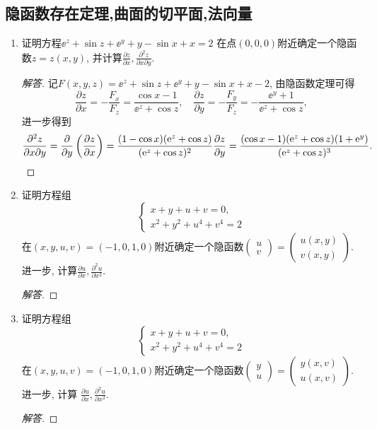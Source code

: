 \subsection{隐函数存在定理,曲面的切平面,法向量}
\begin{1a}
\begin{enumerate}
\item 证明方程\(\ee^z+\sin z+\ee^y+y-\sin x+x=2\)
在点\((0,0,0)\)附近确定一个隐函数\(z=z(x,y)\), 
并计算\(\frac{\partial z}{\partial x},\frac{\partial^2 z}{\partial x\partial y}\).
\begin{proof}[解答]
记\(F(x,y,z)=\ee^z+\sin z+\ee^y+y-\sin x+x-2\), 由隐函数定理可得
\[\frac{\partial z}{\partial x}=-\frac{F_x}{F_z}=\frac{\cos x-1}{\ee^z+\cos z},\quad
\frac{\partial z}{\partial y}=-\frac{F_y}{F_z}=-\frac{\ee^y+1}{\ee^z+\cos z},\]
进一步得到\[\frac{\partial^2z}{\partial x\partial y}
=\frac{\partial}{\partial y}\left(\frac{\partial z}{\partial x}\right)
=\frac{(1-\cos x)({\rm e}^z+\cos z)}{({\rm e}^z+\cos z)^2}\frac{\partial z}{\partial y}
=\frac{(\cos x-1)({\rm e}^z+\cos z)(1+{\rm e}^y)}{({\rm e}^z+\cos z)^3}.\qedhere\]
\end{proof}
\item 证明方程组\[\begin{cases}
    x+y+u+v=0,\\ x^2+y^2+u^4+v^4=2
\end{cases}\]在\((x,y,u,v)=(-1,0,1,0)\)附近确定一个隐函数\(\begin{pmatrix}
u\\ v
\end{pmatrix}=\begin{pmatrix}
u(x,y)\\v(x,y)
\end{pmatrix}\). 进一步, 计算\(\frac{\partial u}{\partial x},\frac{\partial^2u}{\partial x^2}.\)
\begin{proof}[解答]

\end{proof}

\item 证明方程组\[\begin{cases}
    x+y+u+v=0,\\x^2+y^2+u^4+v^4=2
\end{cases}\]在\((x,y,u,v)=(-1,0,1,0)\)附近确定一个隐函数\(\begin{pmatrix}
y\\ u
\end{pmatrix}=\begin{pmatrix}
y(x,v)\\u(x,v)
\end{pmatrix}\). 进一步, 计算
\(\frac{\partial u}{\partial x},\frac{\partial^2u}{\partial x^2}.\)
\begin{proof}[解答]

\end{proof}
\end{enumerate}
\end{1a}

